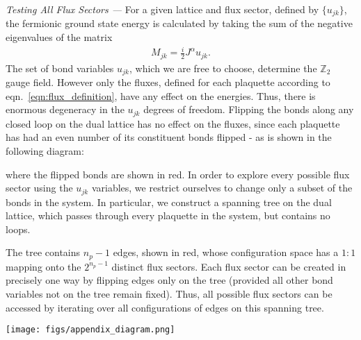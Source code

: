 \documentclass[%
 reprint,
superscriptaddress,
 amsmath,amssymb,
aps,
]{revtex4-2}
\begin{document}
{\it Testing All Flux Sectors ---}
For a given lattice and flux sector, defined by $\{ u_{jk}\}$, the fermionic ground state energy is calculated by taking the sum of the negative eigenvalues of the matrix
\begin{align}
    M_{jk} = \frac{i}{2} J^{\alpha} u_{jk}.
\end{align}
The set of bond variables $u_{jk}$, which we are free to choose, determine the $\mathbb Z_2$ gauge field. However only the fluxes, defined for each plaquette according to eqn.~\ref{eqn:flux_definition}, have any effect on the energies. Thus, there is enormous degeneracy in the $u_{jk}$ degrees of freedom. Flipping the bonds along any closed loop on the dual lattice has no effect on the fluxes, since each plaquette has had an even number of its constituent bonds flipped - as is shown in the following diagram:
\begin{center}
    
\end{center}
where the flipped bonds are shown in red. In order to explore every possible flux sector using the $u_{jk}$ variables, we restrict ourselves to change only a subset of the bonds in the system. In particular, we construct a spanning tree on the dual lattice, which passes through every plaquette in the system, but contains no loops. 
\begin{center}
    
\end{center}
The tree contains $n_p - 1$ edges, shown in red, whose configuration space has a $1:1$ mapping onto the $2^{n_p - 1}$ distinct flux sectors. Each flux sector can be created in precisely one way by flipping edges only on the tree (provided all other bond variables not on the tree remain fixed). Thus, all possible flux sectors can be accessed by iterating over all configurations of edges on this spanning tree.

\begin{figure*}[t]
    \centering
    \texttt{[image: figs/appendix\_diagram.png]}
    \caption{(a) The energy of every flux sector explored for a system of 16 plaquettes, the order is arbitrary. The two ground state flux sectors can be identified as the points with lowest energy. (b) The fermion gap for each of the flux sectors explored. Note that the largest fermion gap coincides with the ground state flux sector. This occurred in $\sim 85\%$ of cases tested. (c) Average energy of the systems tested over a range of system sizes from $n_p$ = 9 to $n_p = 1600$. The region between the upper and lower quartiles is shown in red, and the full range of energies obtained is shown in orange. (d) Average fermion gap as a function of system size. Again, the region between the upper and lower quartiles is shown in red, and the full range is shown in orange. As can be seen, no gapless systems were found for $n_p > 20$. }
    \label{fig:energy_gaps_example}
\end{figure*}
\end{document}
